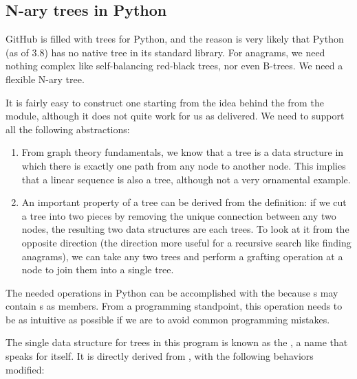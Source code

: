 \documentclass[letterpaper, 11pt]{article}
\begin{document}
\subsection{N-ary trees in Python}

GitHub is filled with trees for Python, and the reason is very
likely that Python (as of 3.8) has no native tree in its standard
library.  For anagrams, we need nothing complex like self-balancing
red-black trees, nor even B-trees. We need a flexible N-ary tree.

It is fairly easy to construct one starting from the idea behind
the  from the  module, although
it does not quite work for us as delivered. We need to support all
the following abstractions:

\begin{enumerate}
\item From graph theory fundamentals, we know that a tree is a data
structure in which there is exactly one path from any node to another
node. This implies that a linear sequence is also a tree, although
not a very ornamental example.

\item An important property of a tree can be derived from the
definition: if we cut a tree into two pieces by removing the unique
connection between any two nodes, the resulting two data structures
are each trees. To look at it from the opposite direction (the
direction more useful for a recursive search like finding anagrams),
we can take any two trees and perform a grafting operation at a
node to join them into a single tree.

\end{enumerate}

The needed operations in Python can be accomplished with the
 because s may contain s as members.
From a programming standpoint, this operation needs to be as intuitive
as possible if we are to avoid common programming mistakes.

The single data structure for trees in this program is known as 
the , a name that speaks for itself. It is directly
derived from , with the following behaviors modified:
\end{document}
